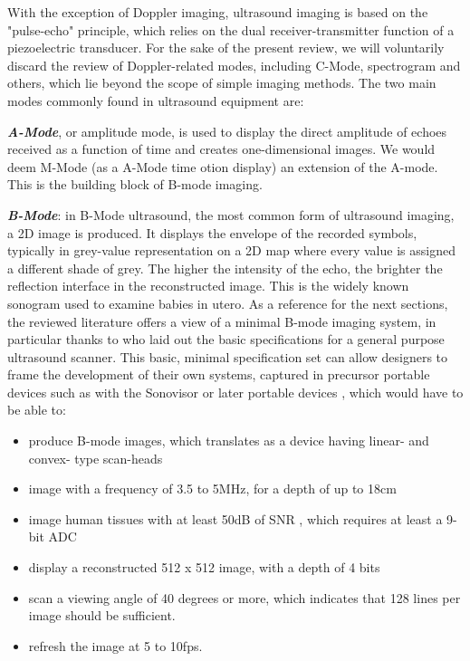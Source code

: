 \documentclass{article}
\begin{document}
With the exception of Doppler imaging, ultrasound imaging is based on the "pulse-echo" principle, which relies on the dual receiver-transmitter function of a piezoelectric transducer. For the sake of the present review, we will voluntarily discard the review of Doppler-related modes, including C-Mode, spectrogram and others, which lie beyond the scope of simple imaging methods. The two main modes commonly found in ultrasound equipment are:

\textbf{\textit{A-Mode}}, or amplitude mode, is used to display the direct amplitude of echoes received as a function of time and creates one-dimensional images. We would deem M-Mode (as a A-Mode time otion display) an extension of the A-mode. This is the building block of B-mode imaging.

\textbf{\textit{B-Mode}}: in B-Mode ultrasound, the most common form of ultrasound imaging, a 2D image is produced. It displays the envelope of the recorded symbols, typically in grey-value representation on a 2D map where every value is assigned a different shade of grey. The higher the intensity of the echo, the brighter the reflection interface in the reconstructed image. This is the widely known sonogram used to examine babies in utero. As a reference for the next sections, the reviewed literature offers a view of a minimal B-mode imaging system, in particular thanks to \cite{kurjak_use_1986} who laid out the basic specifications for a general purpose ultrasound scanner. This basic, minimal specification set can allow designers to frame the development of their own systems, captured in precursor portable devices such as with the Sonovisor \cite{zeiss_sonovisor_1962} or later portable devices \cite{ligtvoet_real_1978}, which would have to be able to:

\begin{itemize}
\setlength\itemsep{0.01em}
\item produce B-mode images, which translates as a device having linear- and convex- type scan-heads
\item image with a frequency of 3.5 to 5MHz, for a depth of up to 18cm
\item image human tissues with at least 50dB of SNR \cite{attarzadeh_low-power_2017}, which requires at least a 9-bit ADC 
\item display a reconstructed 512 x 512 image, with a depth of 4 bits 
\item scan a viewing angle of 40 degrees or more, which indicates that 128 lines per image should be sufficient.
\item refresh the image at 5 to 10fps.
\end{itemize}
\end{document}
